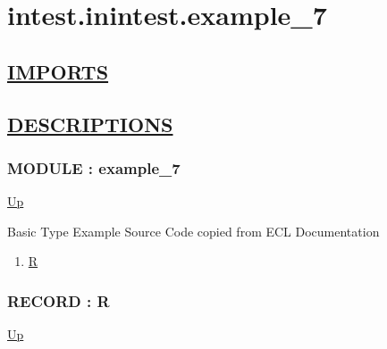 \chapter*{intest.inintest.example\_7}
\hypertarget{ecldoc:toc:intest.inintest.example_7}{}

\section*{\underline{IMPORTS}}

\section*{\underline{DESCRIPTIONS}}
\subsection*{MODULE : example\_7}
\hypertarget{ecldoc:intest.inintest.example_7}{}
\par
\begin{minipage}[t]{\textwidth}
\begin{flushleft}
  
\end{flushleft}
\end{minipage}
\hyperlink{ecldoc:toc:intest/inintest}{Up} \\
\par
Basic Type Example Source Code copied from ECL Documentation \\
\par
\begin{enumerate}
\item \hyperlink{ecldoc:intest.inintest.example_7.r}{R}
\end{enumerate}
\subsection*{RECORD : R}
\hypertarget{ecldoc:intest.inintest.example_7.r}{}
\par
\begin{minipage}[t]{\textwidth}
\begin{flushleft}
  
\end{flushleft}
\end{minipage}
\hyperlink{ecldoc:intest.inintest.example_7}{Up} \\
\par
\par

